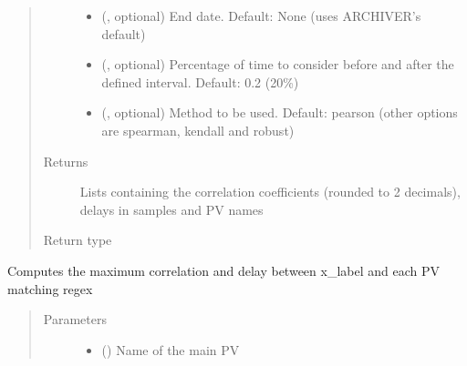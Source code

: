 \documentclass[letterpaper,10pt,english]{sphinxmanual}
\begin{document}
\begin{fulllineitems}
\begin{fulllineitems}
\begin{quote}
\begin{description}
\begin{itemize}
\item {} 
\sphinxAtStartPar
{} (, optional) \textendash{} End date. Default: None (uses ARCHIVER’s default)

\item {} 
\sphinxAtStartPar
{} (, optional) \textendash{} Percentage of time to consider before and after the defined interval. Default: 0.2 (20\%)

\item {} 
\sphinxAtStartPar
{} (, optional) \textendash{} Method to be used. Default: pearson (other options are spearman, kendall and robust)

\end{itemize}

\item[{Returns}] \leavevmode
\sphinxAtStartPar
Lists containing the correlation coefficients (rounded to 2 decimals), delays in samples and PV names

\item[{Return type}] \leavevmode
\sphinxAtStartPar
{}

\end{description}\end{quote}

\end{fulllineitems}


\begin{fulllineitems}
\label{\detokenize{dataset:dataset.Dataset.correlate_EPICS}}
\sphinxAtStartPar
Computes the maximum correlation and delay between x\_label and each PV matching regex
\begin{quote}\begin{description}
\item[{Parameters}] \leavevmode\begin{itemize}
\item {} 
\sphinxAtStartPar
{} () \textendash{} Name of the main PV


\end{itemize}
\end{description}
\end{quote}
\end{fulllineitems}
\end{fulllineitems}
\end{document}
